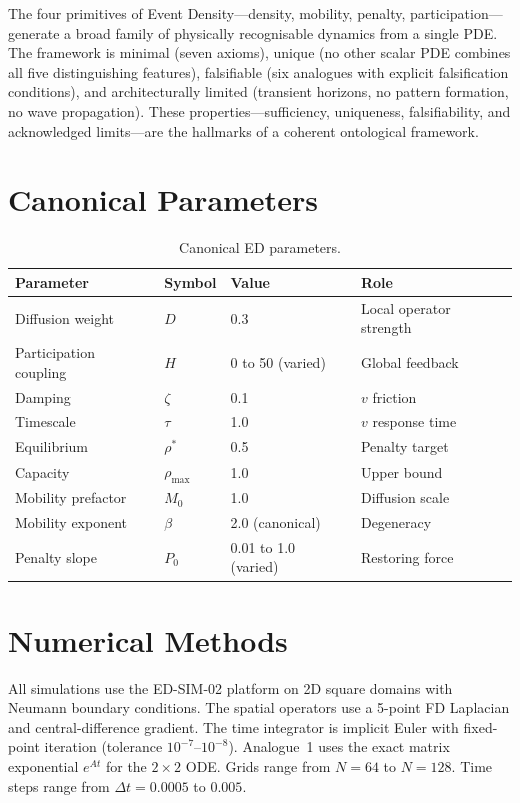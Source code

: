 \documentclass[11pt]{article}
\begin{document}
The four primitives of Event Density---density, mobility, penalty, participation---generate a broad family of physically recognisable dynamics from a single PDE. The framework is minimal (seven axioms), unique (no other scalar PDE combines all five distinguishing features), falsifiable (six analogues with explicit falsification conditions), and architecturally limited (transient horizons, no pattern formation, no wave propagation). These properties---sufficiency, uniqueness, falsifiability, and acknowledged limits---are the hallmarks of a coherent ontological framework.

\appendix

\section{Canonical Parameters}

\begin{table}[h]
\centering
\begin{tabular}{@{}llll@{}}
\toprule
Parameter & Symbol & Value & Role \\
\midrule
Diffusion weight & \(D\) & 0.3 & Local operator strength \\
Participation coupling & \(H\) & 0 to 50 (varied) & Global feedback \\
Damping & \(\zeta\) & 0.1 & \(v\) friction \\
Timescale & \(\tau\) & 1.0 & \(v\) response time \\
Equilibrium & \(\rho^*\) & 0.5 & Penalty target \\
Capacity & \(\rho_{\max}\) & 1.0 & Upper bound \\
Mobility prefactor & \(M_0\) & 1.0 & Diffusion scale \\
Mobility exponent & \(\beta\) & 2.0 (canonical) & Degeneracy \\
Penalty slope & \(P_0\) & 0.01 to 1.0 (varied) & Restoring force \\
\bottomrule
\end{tabular}
\caption{Canonical ED parameters.}
\label{tab:canonical}
\end{table}

\section{Numerical Methods}

All simulations use the ED-SIM-02 platform on 2D square domains with Neumann boundary conditions. The spatial operators use a 5-point FD Laplacian and central-difference gradient. The time integrator is implicit Euler with fixed-point iteration (tolerance \(10^{-7}\)--\(10^{-8}\)). Analogue~1 uses the exact matrix exponential \(e^{At}\) for the \(2\times2\) ODE. Grids range from \(N = 64\) to \(N = 128\). Time steps range from \(\Delta t = 0.0005\) to \(0.005\).
\end{document}
